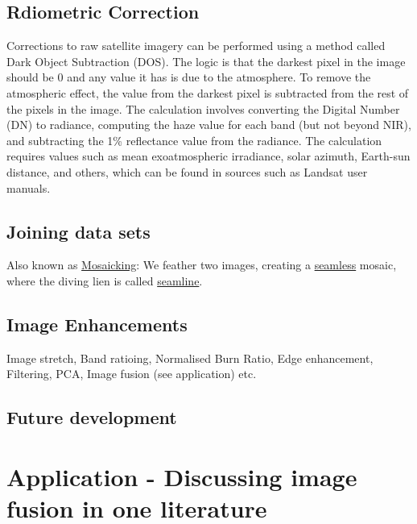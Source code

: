 \documentclass[
  letterpaper,
  DIV=11,
  numbers=noendperiod]{scrreprt}
\begin{document}
\hypertarget{rdiometric-correction}{%
\subsection{Rdiometric Correction}\label{rdiometric-correction}}

Corrections to raw satellite imagery can be performed using a method
called Dark Object Subtraction (DOS). The logic is that the darkest
pixel in the image should be 0 and any value it has is due to the
atmosphere. To remove the atmospheric effect, the value from the darkest
pixel is subtracted from the rest of the pixels in the image. The
calculation involves converting the Digital Number (DN) to radiance,
computing the haze value for each band (but not beyond NIR), and
subtracting the 1\% reflectance value from the radiance. The calculation
requires values such as mean exoatmospheric irradiance, solar azimuth,
Earth-sun distance, and others, which can be found in sources such as
Landsat user manuals.

\hypertarget{joining-data-sets}{%
\subsection{Joining data sets}\label{joining-data-sets}}

Also known as \uline{Mosaicking}: We feather two images, creating a
\uline{seamless} mosaic, where the diving lien is called
\uline{seamline}.

\hypertarget{image-enhancements}{%
\subsection{Image Enhancements}\label{image-enhancements}}

Image stretch, Band ratioing, Normalised Burn Ratio, Edge enhancement,
Filtering, PCA, Image fusion (see application) etc.

\hypertarget{future-development-1}{%
\subsection{Future development}\label{future-development-1}}

\hypertarget{application---discussing-image-fusion-in-one-literature}{%
\section{Application - Discussing image fusion in one
literature}\label{application---discussing-image-fusion-in-one-literature}}
\end{document}
